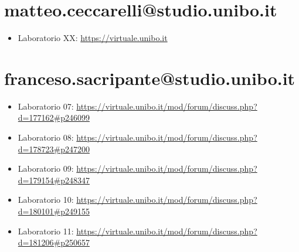 \documentclass[a4paper,12pt]{report}
\begin{document}
\section{matteo.ceccarelli@studio.unibo.it}
\begin{itemize}
	\item Laboratorio XX: \url{https://virtuale.unibo.it}
\end{itemize}

\section{franceso.sacripante@studio.unibo.it}
\begin{itemize}
	\item Laboratorio 07: \url{https://virtuale.unibo.it/mod/forum/discuss.php?d=177162#p246099}
	\item Laboratorio 08: \url{https://virtuale.unibo.it/mod/forum/discuss.php?d=178723#p247200}
	\item Laboratorio 09: \url{https://virtuale.unibo.it/mod/forum/discuss.php?d=179154#p248347}
	\item Laboratorio 10: \url{https://virtuale.unibo.it/mod/forum/discuss.php?d=180101#p249155}
	\item Laboratorio 11: \url{https://virtuale.unibo.it/mod/forum/discuss.php?d=181206#p250657}
\end{itemize}




\end{document}

